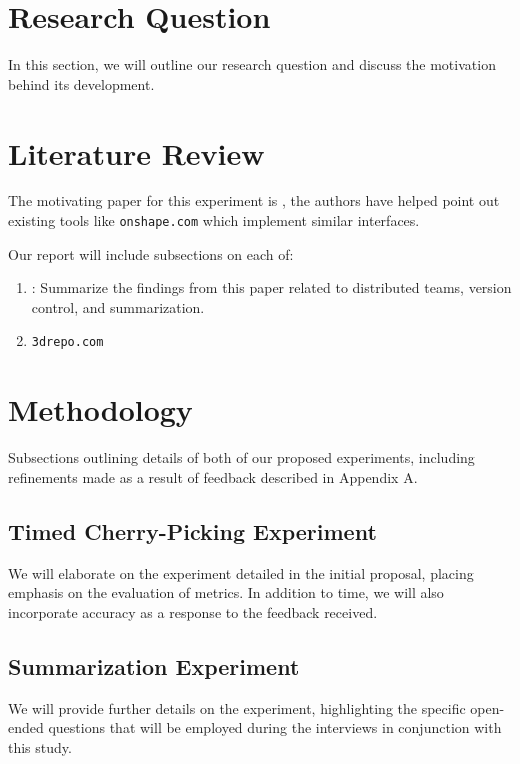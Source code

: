 \documentclass[sigconf,authorversion,nonacm]{acmart}
\begin{document}
\section{Research Question}

In this section, we will outline our research question and discuss the motivation behind its development.
\section{Literature Review}

The motivating paper for this experiment is \citet{cheng2023age}, the authors have helped point out existing tools like \texttt{onshape.com} which implement similar interfaces.

Our report will include subsections on each of:

\begin{enumerate}
	\item \citet{cheng2023age}: Summarize the findings from this paper related to distributed teams, version control, and summarization.
	\item {\texttt{3drepo.com}}
\end{enumerate}

\section{Methodology}

Subsections outlining details of both of our proposed experiments, including refinements made as a result of feedback described in Appendix A.

\subsection{Timed Cherry-Picking Experiment}

We will elaborate on the experiment detailed in the initial proposal, placing emphasis on the evaluation of metrics. In addition to time, we will also incorporate accuracy as a response to the feedback received.

\subsection{Summarization Experiment}

We will provide further details on the experiment, highlighting the specific open-ended questions that will be employed during the interviews in conjunction with this study.
\end{document}
